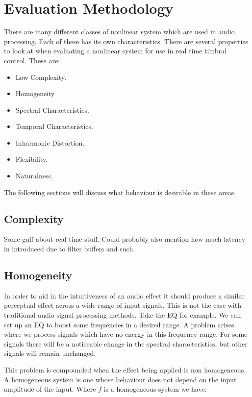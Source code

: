 \section{Evaluation Methodology}
\label{sec:Excitation-Evaluation}
	There are many different classes of nonlinear system which are used in audio processing. Each of these has its own
	characteristics. There are several properties to look at when evaluating a nonlinear system for use in real time
	timbral control. These are:

	\begin{itemize}
		\item Low Complexity.
		\item Homogeneity
		\item Spectral Characteristics.
		\item Temporal Characteristics.
		\item Inharmonic Distortion.
		\item Flexibility.
		\item Naturalness.
	\end{itemize}

	The following sections will discuss what behaviour is desirable in these areas.

	\subsection{Complexity}
	\label{sec:Excitation-Evaluation-Complexity}
		\note
		{
			Some guff about real time stuff. Could probably also mention how much latency in introduced due to
			filter buffers and such.
		}
	
	\subsection{Homogeneity}
	\label{sec:Excitation-Evaluation-Homogeneity}
		In order to aid in the intuitiveness of an audio effect it should produce a similar perceptual effect
		across a wide range of input signals. This is not the case with traditional audio signal processing
		methods. Take the EQ for example. We can set up an EQ to boost some frequencies in a desired range. A
		problem arises where we process signals which have no energy in this frequency range. For some signals
		there will be a noticeable change in the spectral characteristics, but other signals will remain unchanged.

		This problem is compounded when the effect being applied is non homogeneous. A homogeneous system is one
		whose behaviour does not depend on the input amplitude of the input.  Where $f$ is a homogeneous system we
		have:

